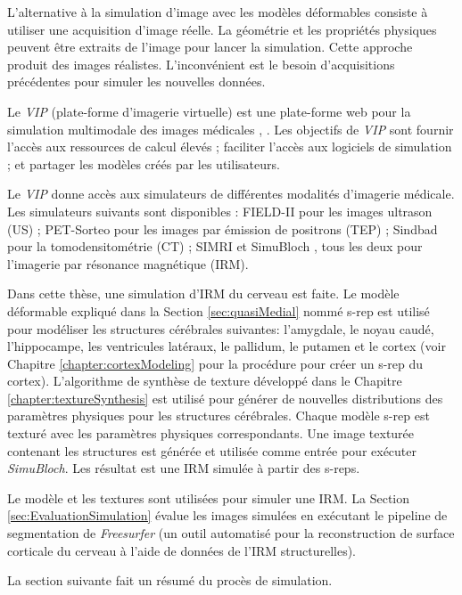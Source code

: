 L'alternative à la simulation d'image avec les modèles déformables consiste à utiliser
une acquisition d'image réelle. La géométrie et les propriétés physiques peuvent être extraits
de l'image pour lancer la simulation.
Cette approche produit des images réalistes. L'inconvénient est le
besoin d'acquisitions précédentes pour simuler les nouvelles données.

Le \textit{VIP} (plate-forme d'imagerie virtuelle) est une plate-forme web pour la simulation multimodale des images médicales \cite{marion2011multi}, \cite{glatard2011virtual}.
Les objectifs de \textit{VIP} sont fournir l'accès aux ressources de calcul élevés ; faciliter l'accès aux logiciels de simulation ;
et partager les modèles créés par les utilisateurs.

Le \textit{VIP} donne accès aux simulateurs de différentes modalités d'imagerie médicale.
Les simulateurs suivants sont disponibles :
FIELD-II pour les images ultrason (US) \cite{jensen2004simulation} ;
PET-Sorteo pour les images par émission de positrons (TEP) \cite{reilhac2004}; Sindbad pour la tomodensitométrie (CT) \cite{tabary2009realistic};
SIMRI \cite{benoit2005simri} et SimuBloch \cite{caom3}, tous les deux pour l'imagerie par résonance magnétique (IRM).

Dans cette thèse, une simulation d'IRM du cerveau est faite.
Le modèle déformable expliqué dans la Section \ref{sec:quasiMedial} nommé s-rep est utilisé
pour modéliser les structures cérébrales suivantes:
l'amygdale, le noyau caudé, l'hippocampe, les ventricules latéraux, le pallidum, le putamen et le cortex 
(voir Chapitre \ref{chapter:cortexModeling} pour la procédure pour créer un s-rep du cortex).
L'algorithme de synthèse de texture développé dans le Chapitre \ref{chapter:textureSynthesis} est utilisé
pour générer de nouvelles distributions des paramètres physiques pour les structures cérébrales.
Chaque modèle s-rep est texturé avec les paramètres physiques correspondants.
Une image texturée contenant les structures est générée et utilisée comme entrée pour exécuter \textit{SimuBloch}. 
Les résultat est une IRM simulée à partir des s-reps.

Le modèle et les textures sont utilisées pour simuler une IRM.
La Section \ref{sec:EvaluationSimulation} évalue les images simulées en exécutant le pipeline de segmentation
de \textit{Freesurfer} (un outil automatisé pour la reconstruction de surface corticale du cerveau à l'aide de données de l'IRM structurelles).

La section suivante fait un résumé du procès de simulation.

